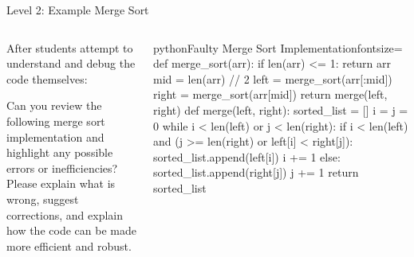 \documentclass[xcolor=dvipsnames, aspectratio=169]{beamer}
\begin{document}
\begin{frame}[fragile]{Level 2: Example Merge Sort}
  \begin{columns}[T]
    \begin{column}{0.42\textwidth}
      After students attempt to understand and debug the code themselves:
      \begin{tcolorbox}[enhanced, colback=gray!5, colframe=gray!40, title=AI Prompt, fonttitle=\small, arc=0mm, boxrule=0.1pt]
Can you review the following merge sort implementation and highlight any possible errors or inefficiencies? Please explain what is wrong, suggest corrections, and explain how the code can be made more efficient and robust.
      \end{tcolorbox}
    \end{column}
    
    \begin{column}{0.52\textwidth}
      \vspace{-1.5em}
      \begin{codeboxtc}{python}{Faulty Merge Sort Implementation}{}{fontsize=\scriptsize}
    def merge_sort(arr):
        if len(arr) <= 1:
            return arr
        mid = len(arr) // 2
        left = merge_sort(arr[:mid])
        right = merge_sort(arr[mid]) 
        return merge(left, right)
    def merge(left, right):
        sorted_list = []
        i = j = 0
        while i < len(left) or j < len(right):          
            if i < len(left) and (j >= len(right) or left[i] < right[j]):
                sorted_list.append(left[i])
                i += 1
            else:
                sorted_list.append(right[j])
                j += 1
        return sorted_list\end{codeboxtc}
    \end{column}
  \end{columns}
\end{frame}
\end{document}
